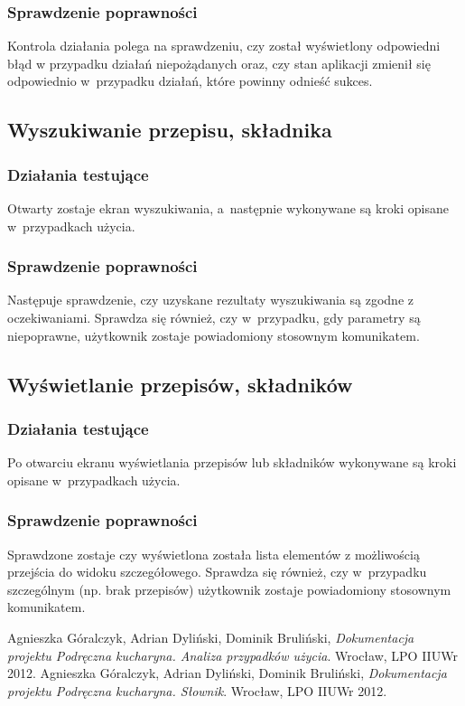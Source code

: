 \documentclass[12pt,leqno, twoside]{mwart}
\begin{document}
\subsubsection{Sprawdzenie poprawności}
\noindent Kontrola działania polega na sprawdzeniu, czy został wyświetlony odpowiedni błąd w przypadku działań
niepożądanych oraz, czy stan aplikacji zmienił się odpowiednio w~przypadku działań, które powinny odnieść sukces.

\subsection{Wyszukiwanie przepisu, składnika}
\subsubsection{Działania testujące}
\noindent Otwarty zostaje ekran wyszukiwania, a~następnie wykonywane są kroki opisane w~przypadkach
użycia.

\subsubsection{Sprawdzenie poprawności}
\noindent Następuje sprawdzenie, czy uzyskane rezultaty wyszukiwania są zgodne z oczekiwaniami. Sprawdza się również, czy
w~przypadku, gdy parametry są niepoprawne, użytkownik zostaje powiadomiony stosownym komunikatem.

\subsection{Wyświetlanie przepisów, składników}
\subsubsection{Działania testujące}
\noindent Po otwarciu ekranu wyświetlania przepisów lub składników wykonywane są kroki opisane w~przypadkach użycia. 

\subsubsection{Sprawdzenie poprawności}
\noindent Sprawdzone zostaje czy wyświetlona została lista elementów z możliwością przejścia do widoku szczegółowego.
Sprawdza się również, czy w~przypadku szczególnym (np. brak przepisów) użytkownik zostaje powiadomiony stosownym
komunikatem.
\newpage
\begin{thebibliography}{9}
    Agnieszka Góralczyk, Adrian Dyliński, Dominik Bruliński, {\it Dokumentacja projektu Podręczna
      kucharyna. Analiza przypadków użycia}. Wrocław, LPO IIUWr 2012.
    Agnieszka Góralczyk, Adrian Dyliński, Dominik Bruliński, {\it Dokumentacja projektu Podręczna
      kucharyna. Słownik}. Wrocław, LPO IIUWr 2012.
\end{thebibliography}
\end{document}

